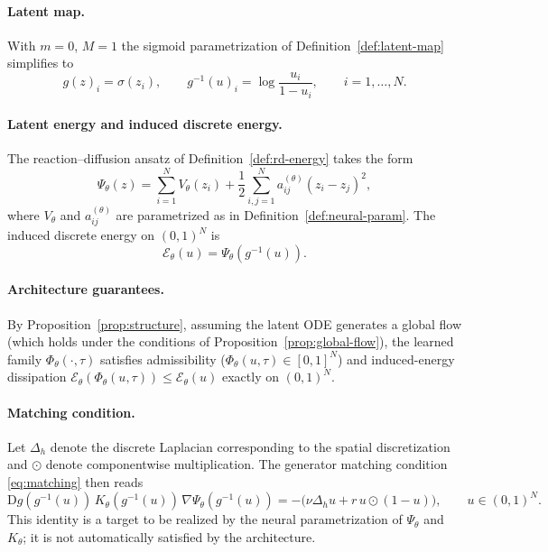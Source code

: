 \documentclass[11pt]{article}
\newcommand{\cE}{\mathcal{E}}
\newcommand{\PhiT}{\Phi_{\theta}}
\begin{document}
\paragraph{Latent map.}
With $m=0$, $M=1$ the sigmoid parametrization of Definition~\ref{def:latent-map} simplifies to
\begin{equation}\label{eq:g-fisher}
g(z)_i=\sigma(z_i),\qquad g^{-1}(u)_i=\log\frac{u_i}{1-u_i},\qquad i=1,\dots,N.
\end{equation}

\paragraph{Latent energy and induced discrete energy.}
The reaction--diffusion ansatz of Definition~\ref{def:rd-energy} takes the form
\begin{equation}\label{eq:psi-fisher}
\Psi_{\theta}(z)=\sum_{i=1}^N V_{\theta}(z_i)+\frac12\sum_{i,j=1}^N a_{ij}^{(\theta)}(z_i-z_j)^2,
\end{equation}
where $V_{\theta}$ and $a_{ij}^{(\theta)}$ are parametrized as in Definition~\ref{def:neural-param}. The induced discrete energy on $(0,1)^N$ is
\begin{equation}\label{eq:Etheta-fisher}
\cE_{\theta}(u)=\Psi_{\theta}(g^{-1}(u)).
\end{equation}

\paragraph{Architecture guarantees.}
By Proposition~\ref{prop:structure}, assuming the latent ODE generates a global flow (which holds under the conditions of Proposition~\ref{prop:global-flow}), the learned family $\PhiT(\cdot,\tau)$ satisfies admissibility ($\PhiT(u,\tau)\in[0,1]^N$) and induced-energy dissipation $\cE_{\theta}(\PhiT(u,\tau))\le\cE_{\theta}(u)$ exactly on $(0,1)^N$.

\paragraph{Matching condition.}
Let $\Delta_h$ denote the discrete Laplacian corresponding to the spatial discretization and $\odot$ denote componentwise multiplication. The generator matching condition \eqref{eq:matching} then reads
\begin{equation}\label{eq:matching-fisher}
\mathrm{D}g(g^{-1}(u))\,K_{\theta}(g^{-1}(u))\,\nabla\Psi_{\theta}(g^{-1}(u)) = -\bigl(\nu\Delta_h u + r\,u\odot(1-u)\bigr),\qquad u\in(0,1)^N.
\end{equation}
This identity is a target to be realized by the neural parametrization of $\Psi_{\theta}$ and $K_{\theta}$; it is not automatically satisfied by the architecture.
\end{document}
